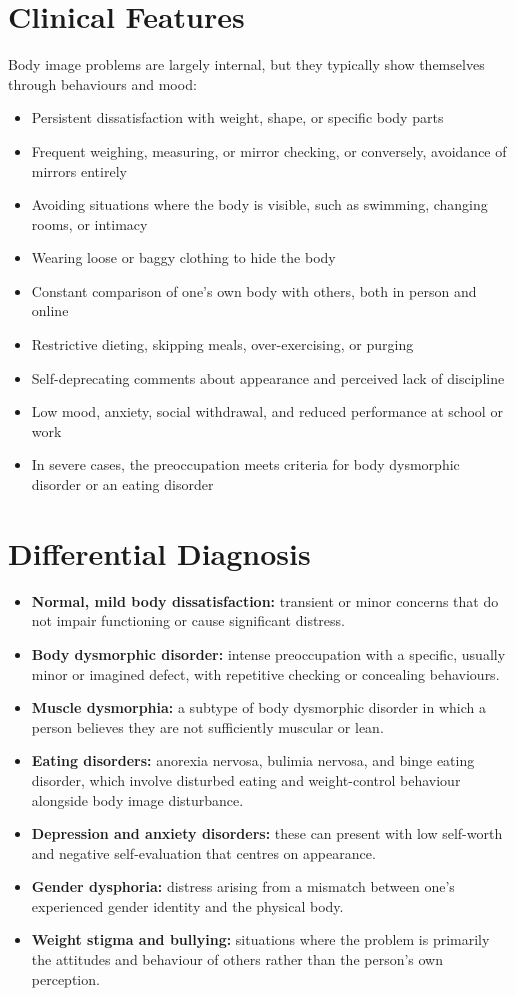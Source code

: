 \section*{Clinical Features}
Body image problems are largely internal, but they typically show themselves through behaviours and mood:
\begin{itemize}
    \item Persistent dissatisfaction with weight, shape, or specific body parts
    \item Frequent weighing, measuring, or mirror checking, or conversely, avoidance of mirrors entirely
    \item Avoiding situations where the body is visible, such as swimming, changing rooms, or intimacy
    \item Wearing loose or baggy clothing to hide the body
    \item Constant comparison of one's own body with others, both in person and online
    \item Restrictive dieting, skipping meals, over-exercising, or purging
    \item Self-deprecating comments about appearance and perceived lack of discipline
    \item Low mood, anxiety, social withdrawal, and reduced performance at school or work
    \item In severe cases, the preoccupation meets criteria for body dysmorphic disorder or an eating disorder
\end{itemize}

\section*{Differential Diagnosis}
\begin{itemize}
    \item \textbf{Normal, mild body dissatisfaction:} transient or minor concerns that do not impair functioning or cause significant distress.
    \item \textbf{Body dysmorphic disorder:} intense preoccupation with a specific, usually minor or imagined defect, with repetitive checking or concealing behaviours.
    \item \textbf{Muscle dysmorphia:} a subtype of body dysmorphic disorder in which a person believes they are not sufficiently muscular or lean.
    \item \textbf{Eating disorders:} anorexia nervosa, bulimia nervosa, and binge eating disorder, which involve disturbed eating and weight-control behaviour alongside body image disturbance.
    \item \textbf{Depression and anxiety disorders:} these can present with low self-worth and negative self-evaluation that centres on appearance.
    \item \textbf{Gender dysphoria:} distress arising from a mismatch between one's experienced gender identity and the physical body.
    \item \textbf{Weight stigma and bullying:} situations where the problem is primarily the attitudes and behaviour of others rather than the person's own perception.
\end{itemize}

